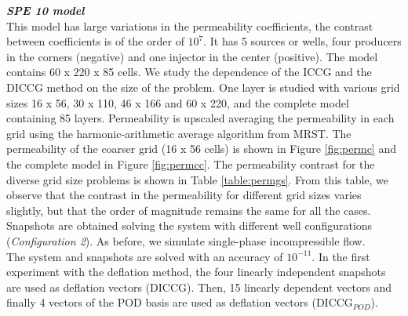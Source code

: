\documentclass[12pt]{article}
\begin{document}
\newpage
\emph{\textbf{SPE 10 model}}\\
This model has large variations in the permeability coefficients, the contrast between coefficients is of the order of $ 10^7$.
It has 5 sources or wells, four producers in the corners (negative) and one injector in the center (positive).
The model contains 60 x 220 x 85 cells. We study the dependence of the ICCG and the DICCG method on the size of the problem. One layer is studied with various grid sizes 16 x 56, 30 x 110, 46 x 166 and 60 x 220, and the complete model containing 85 layers.
Permeability is upscaled
averaging the permeability in each grid using the harmonic-arithmetic average algorithm from MRST.
The permeability of the coarser grid (16 x 56 cells) is shown in Figure \ref{fig:permc} and the complete model in Figure \ref{fig:permcc}.
The permeability contrast for the diverse grid size problems is shown in Table \ref{table:permgs}. From this table, we observe that the contrast in the permeability for different grid sizes varies slightly, but that the order
of magnitude remains the same for all the cases.\\
Snapshots are obtained solving the system with different well
configurations (\emph{Configuration 2}). As before, we simulate single-phase incompressible flow.\\
The system and snapshots are solved with an accuracy of $10^{-11}$.
In the first experiment with the deflation method, the four linearly independent snapshots are used as deflation vectors (DICCG). Then, 
15 linearly dependent vectors and finally 4 vectors of the POD basis are used as deflation vectors (DICCG$_{POD}$). \\ 
\end{document}
